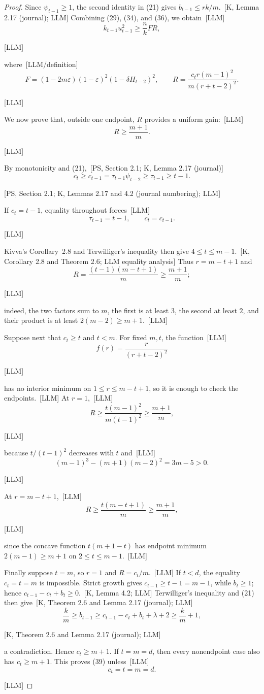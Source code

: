 \documentclass[10pt]{amsart}
\theoremstyle{remark}
\newcommand{\eps}{\varepsilon}
\newcommand{\prov}[1]{\unskip\, {\normalfont\scriptsize\color{provgray}\textsf{[#1]}}}
\newcommand{\eqprov}[1]{%
  \par\nobreak\vspace{-0.68\baselineskip}%
  \noindent\hfill{\normalfont\scriptsize\color{provgray}\textsf{[#1]}}%
  \par\vspace{0.20\baselineskip}%
}
\begin{document}
\begin{proof}
Since $\psi_{t-1}\ge1$, the second identity in (21) gives $b_{t-1}\le rk/m$.\prov{K, Lemma 2.17 (journal); LLM} Combining (29), (34), and (36), we obtain\prov{LLM}
\begin{equation}
k_{t-1}u_{t-1}^2\ge\frac{n}{k}FR,
\end{equation}
\eqprov{LLM}
where\prov{LLM/definition}
\begin{equation}
F=(1-2m\eps)(1-\eps)^2(1-\delta H_{t-2})^2,
\qquad
R=\frac{c_t r(m-1)^2}{m(r+t-2)^2}.
\end{equation}
\eqprov{LLM}

We now prove that, outside one endpoint, $R$ provides a uniform gain:\prov{LLM}
\begin{equation}
R\ge\frac{m+1}{m}.
\end{equation}
\eqprov{LLM}
By monotonicity and (21),\prov{PS, Section 2.1; K, Lemma 2.17 (journal)}
\[
c_t\ge c_{t-1}=\tau_{t-1}\psi_{t-2}\ge\tau_{t-1}\ge t-1.
\]
\eqprov{PS, Section 2.1; K, Lemmas 2.17 and 4.2 (journal numbering); LLM}
If $c_t=t-1$, equality throughout forces\prov{LLM}
\[
\tau_{t-1}=t-1,
\qquad c_t=c_{t-1}.
\]
\eqprov{LLM}
Kivva's Corollary~2.8 and Terwilliger's inequality then give $4\le t\le m-1$.\prov{K, Corollary 2.8 and Theorem 2.6; LLM equality analysis} Thus $r=m-t+1$ and
\[
R=\frac{(t-1)(m-t+1)}{m}\ge\frac{m+1}{m};
\]
\eqprov{LLM}
indeed, the two factors sum to $m$, the first is at least $3$, the second at least $2$, and their product is at least $2(m-2)\ge m+1$.\prov{LLM}

Suppose next that $c_t\ge t$ and $t<m$. For fixed $m,t$, the function\prov{LLM}
\[
f(r)=\frac{r}{(r+t-2)^2}
\]
\eqprov{LLM}
has no interior minimum on $1\le r\le m-t+1$, so it is enough to check the endpoints.\prov{LLM} At $r=1$,\prov{LLM}
\[
R\ge\frac{t(m-1)^2}{m(t-1)^2}\ge\frac{m+1}{m},
\]
\eqprov{LLM}
because $t/(t-1)^2$ decreases with $t$ and\prov{LLM}
\[
(m-1)^3-(m+1)(m-2)^2=3m-5>0.
\]
\eqprov{LLM}
At $r=m-t+1$,\prov{LLM}
\[
R\ge\frac{t(m-t+1)}{m}\ge\frac{m+1}{m},
\]
\eqprov{LLM}
since the concave function $t(m+1-t)$ has endpoint minimum $2(m-1)\ge m+1$ on $2\le t\le m-1$.\prov{LLM}

Finally suppose $t=m$, so $r=1$ and $R=c_t/m$.\prov{LLM} If $t<d$, the equality $c_t=t=m$ is impossible. Strict growth gives $c_{t-1}\ge t-1=m-1$, while $b_t\ge1$; hence $c_{t-1}-c_t+b_t\ge0$.\prov{K, Lemma 4.2; LLM} Terwilliger's inequality and (21) then give\prov{K, Theorem 2.6 and Lemma 2.17 (journal); LLM}
\[
\frac{k}{m}\ge b_{t-1}\ge c_{t-1}-c_t+b_t+\lambda+2\ge\frac{k}{m}+1,
\]
\eqprov{K, Theorem 2.6 and Lemma 2.17 (journal); LLM}
a contradiction. Hence $c_t\ge m+1$. If $t=m=d$, then every nonendpoint case also has $c_t\ge m+1$. This proves (39) unless\prov{LLM}
\begin{equation}
c_t=t=m=d.
\end{equation}
\eqprov{LLM}


\end{proof}
\end{document}
